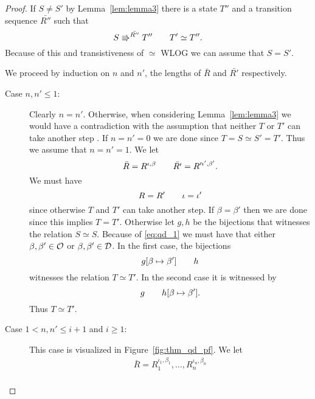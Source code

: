 \begin{proof}
  If $S \neq S'$ by Lemma~\ref{lem:lemma3} there is a state $T''$ and a
  transition sequence $\bar{R''}$ such that
  \begin{equation}
    S \Rrightarrow^{\bar{R''}} T'' \quad\quad T' \simeq T''.
  \end{equation}
  Because of this and transistiveness of $\simeq$ WLOG we can assume that $S =
  S'$.

  We proceed by induction on $n$ and $n'$, the lengths of $\bar{R}$ and
  $\bar{R'}$ respectively.
  \begin{description}
    \item[Case $n, n' \leq 1$:] Clearly $n = n'$. Otherwise, when considering
      Lemma~\ref{lem:lemma3} we would have a contradiction with the assumption
      that neither $T$ or $T'$ can take another step .
      If $n = n' = 0$ we are done since $T = S \simeq S' = T'$. Thus we assume
      that $n = n' = 1$. We let
      \begin{equation*}
        \bar{R} = R^{\iota, \beta} \quad\quad \bar{R'} = R'^{\iota', \beta'}.
      \end{equation*}
      We must have 
      \begin{equation} \label{eq:qd_1}
        R = R' \quad\quad \iota = \iota'
      \end{equation} 
      since otherwise $T$ and $T'$ can take another step.  If $\beta = \beta'$
      then we are done since this implies $T = T'$.  Otherwise let $g, h$ be the
      bijections that witnesses the relation $S \simeq S$. Because of
      \eqref{eq:qd_1} we must have that either $\beta, \beta' \in \mathcal{O}$ or
      $\beta, \beta' \in \mathcal{D}$. In the first case, the bijections
      \begin{equation}
        g[\beta \mapsto \beta'] \quad\quad h
      \end{equation}
      witnesses the relation $T \simeq T'$. In the second case it is witnessed
      by
      \begin{equation*}
        g \quad\quad h[\beta \mapsto \beta'].
      \end{equation*}
      Thus $T \simeq T'$.
    \item[Case $1 < n, n' \leq i+1$ and $i \geq 1$:] This case is visualized in
      Figure~\ref{fig:thm_qd_pf}. We let 
      \begin{equation*}
        \begin{gathered}
          \bar{R} = R_1^{\iota_1, \beta_1}, \dots, R_n^{\iota_n, \beta_n} \\

\end{gathered}
\end{equation*}
\end{description}
\end{proof}
